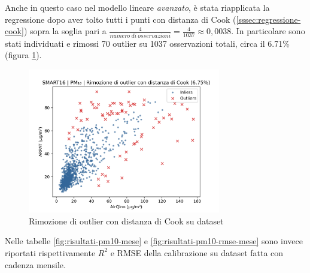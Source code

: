 Anche in questo caso nel modello lineare \textit{avanzato}, è stata riapplicata la regressione dopo aver tolto tutti i punti con distanza di Cook (\ref{sssec:regressione-cook}) sopra la soglia pari a $\frac{4}{numero\ di\ osservazioni} = \frac{4}{1037} \approx 0,0038$. In particolare sono stati individuati e rimossi 70 outlier su 1037 osservazioni totali, circa il 6.71\% (figura \ref{fig:cook-pm10}).

\begin{figure}[H]
\centering
\includegraphics[width=0.75\textwidth,height=\textheight,keepaspectratio]{img/cook_pm10.png}
\caption{Rimozione di outlier con distanza di Cook su dataset }%
\label{fig:cook-pm10}%
\end{figure}

Nelle tabelle \ref{fig:risultati-pm10-mese} e \ref{fig:risultati-pm10-rmse-mese} sono invece riportati rispettivamente $R^2$ e RMSE della calibrazione su dataset  fatta con cadenza mensile.

